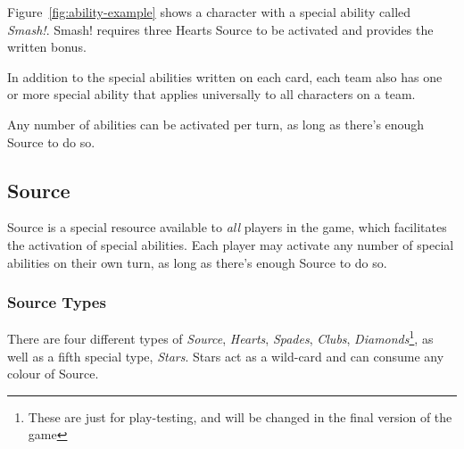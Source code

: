Figure~\ref{fig:ability-example} shows a character with a special ability called \textit{Smash!}.
Smash! requires three Hearts Source to be activated and provides the written bonus.

In addition to the special abilities written on each card, each team also has one or more special ability that applies universally to all characters on a team.

\begin{note} 
    Any number of abilities can be activated per turn, as long as there's enough Source to do so.
\end{note}
\subsection{Source}
Source is a special resource available to \textit{all} players in the game, which facilitates the activation of special abilities.
Each player may activate any number of special abilities on their own turn, as long as there's enough Source to do so.

\subsubsection{Source Types}
There are four different types of \textit{Source}, \textit{Hearts}, \textit{Spades}, \textit{Clubs}, \textit{Diamonds}\footnote{These are just for play-testing, and will be changed in the final version of the game}, as well as a fifth special type, \textit{Stars}.
Stars act as a wild-card and can consume any colour of Source.

